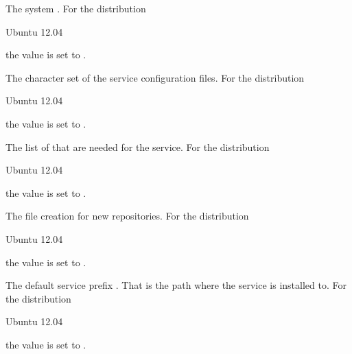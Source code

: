 
The system . 
For the distribution
\begin{inparaitem}
\item[\TheDistribution{ubuntu}] Ubuntu 12.04
\end{inparaitem}
the value is set to .


The character set  of the service configuration files. 
For the distribution
\begin{inparaitem}
\item[\TheDistribution{ubuntu}] Ubuntu 12.04
\end{inparaitem}
the value is set to .


The list of  that are needed for the service.
For the distribution
\begin{inparaitem}
\item[\TheDistribution{ubuntu}] Ubuntu 12.04
\end{inparaitem}
the value is set to .


The file creation  for new repositories.
For the distribution
\begin{inparaitem}
\item[\TheDistribution{ubuntu}] Ubuntu 12.04
\end{inparaitem}
the value is set to .


The default service prefix . That is the path where the
service is installed to. 
For the distribution
\begin{inparaitem}
\item[\TheDistribution{ubuntu}] Ubuntu 12.04
\end{inparaitem}
the value is set to .

